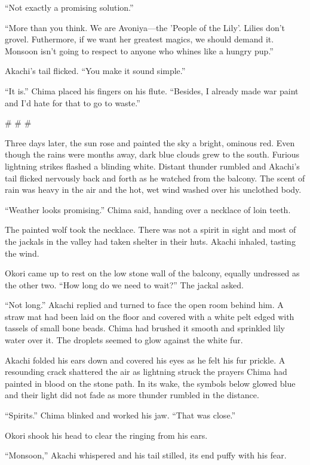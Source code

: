 ``Not exactly a promising solution.''

``More than you think. We are Avoniya---the 'People of the Lily'. Lilies don't grovel. Futhermore, if we want her greatest magics, we should demand it. Monsoon isn't going to respect to anyone who whines like a hungry pup.''

Akachi's tail flicked. ``You make it sound simple.''

``It is.'' Chima placed his fingers on his flute. ``Besides, I already made war paint and I'd hate for that to go to waste.''

\# \# \#

Three days later, the sun rose and painted the sky a bright, ominous red. Even though the rains were months away, dark blue clouds grew to the south. Furious lightning strikes flashed a blinding white. Distant thunder rumbled and Akachi's tail flicked nervously back and forth as he watched from the balcony. The scent of rain was heavy in the air and the hot, wet wind washed over his unclothed body.

``Weather looks promising.'' Chima said, handing over a necklace of loin teeth.

The painted wolf took the necklace. There was not a spirit in sight and most of the jackals in the valley had taken shelter in their huts. Akachi inhaled, tasting the wind.

Okori came up to rest on the low stone wall of the balcony, equally undressed as the other two. ``How long do we need to wait?'' The jackal asked.

``Not long.'' Akachi replied and turned to face the open room behind him. A straw mat had been laid on the floor and covered with a white pelt edged with tassels of small bone beads. Chima had brushed it smooth and sprinkled lily water over it. The droplets seemed to glow against the white fur.

Akachi folded his ears down and covered his eyes as he felt his fur prickle. A resounding crack shattered the air as lightning struck the prayers Chima had painted in blood on the stone path. In its wake, the symbols below glowed blue and their light did not fade as more thunder rumbled in the distance.

``Spirits.'' Chima blinked and worked his jaw. ``That was close.''

Okori shook his head to clear the ringing from his ears.

``Monsoon,'' Akachi whispered and his tail stilled, its end puffy with his fear.

